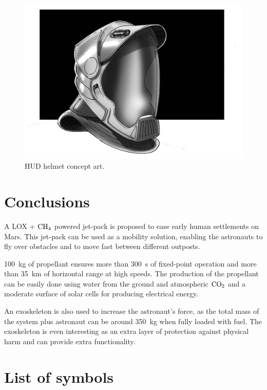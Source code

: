 \documentclass[twocolumn]{article}
\newcommand{\COtwo}{\textnormal{CO}_2}
\newcommand{\CHfour}{\textnormal{CH}_4}
\begin{document}
\begin{figure}
  \centering
    \includegraphics[width=\textwidth]{img/01_casco.jpg}
    \caption{HUD helmet concept art.}
    \label{fig:casco_art}
\end{figure}

\section{Conclusions}

A LOX + $\CHfour$ powered jet-pack is proposed to ease early human settlements 
on Mars. This jet-pack can be used as a mobility solution, enabling the 
astronauts to fly over obstacles and to move fast between different outposts.

\SI{100}{\kilogram} of propellant ensures more than \SI{300}{\second} of 
fixed-point operation and more than \SI{35}{\kilo\metre} of horizontal range at 
high speeds. The production of the propellant can be easily done using water 
from the ground and atmospheric $\COtwo$ and a moderate surface of solar cells 
for producing electrical energy.

An exoskeleton is also used to increase the astronaut's force, as the total 
mass of the system plus astronaut can be around \SI{350}{\kilogram} when fully 
loaded with fuel. The exoskeleton is even interesting as an extra layer of 
protection against physical harm and can provide extra functionality.

\section*{List of symbols}
\end{document}
